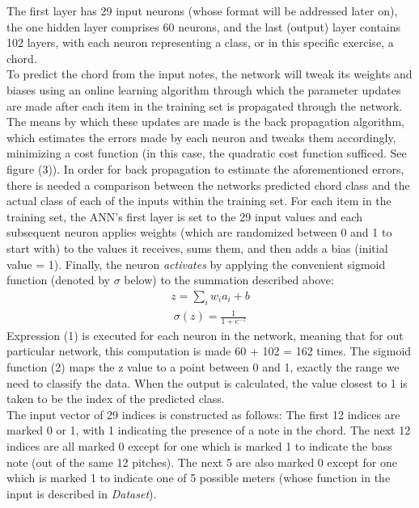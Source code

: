 \documentclass[a4paper]{article}
\begin{document}
The first layer has 29 input neurons (whose format will be addressed later on), the one hidden layer comprises 60 neurons, and the last (output) layer contains 102 layers, with each neuron representing a class, or in this specific exercise, a chord. 
\\[12pt]
To predict the chord from the input notes, the network will tweak its weights and biases using an online learning algorithm through which the parameter updates are made after each item in the training set is propagated through the network.
\\[12pt]
The means by which these updates are made is the back propagation algorithm, which estimates the errors made by each neuron and tweaks them accordingly, minimizing a cost function (in this case, the quadratic cost function sufficed. See figure (3)). In order for back propagation to estimate the aforementioned errors, there is needed a comparison between the networks predicted chord class and the actual class of each of the inputs within the training set. For each item in the training set, the ANN's first layer is set to the 29 input values and each subsequent neuron applies weights (which are randomized between 0 and 1 to start with) to the values it receives, sums them, and then adds a bias (initial value = 1). Finally, the neuron \textit{activates} by applying the convenient sigmoid function (denoted by $\sigma$ below) to the summation described above:
\begin{eqnarray}
z = \sum_i{w_ia_i} + b
\end{eqnarray}
\begin{eqnarray}
\sigma(z) = \frac{1}{1 + e^{-z}}
\end{eqnarray}
Expression (1) is executed for each neuron in the network, meaning that for out particular network, this computation is made 60 + 102 = 162 times. The sigmoid function (2) maps the z value to a point between 0 and 1, exactly the range we need to classify the data. When the output is calculated, the value closest to 1 is taken to be the index of the predicted class.
\\[12pt]
The input vector of 29 indices is constructed as follows:
The first 12 indices are marked 0 or 1, with 1 indicating the presence of a note in the chord. The next 12 indices are all marked 0 except for one which is marked 1 to indicate the bass note (out of the same 12 pitches). The next 5 are also marked 0 except for one which is marked 1 to indicate one of 5 possible meters (whose function in the input is described in \textit{Dataset}).
\\[12pt]
\end{document}

